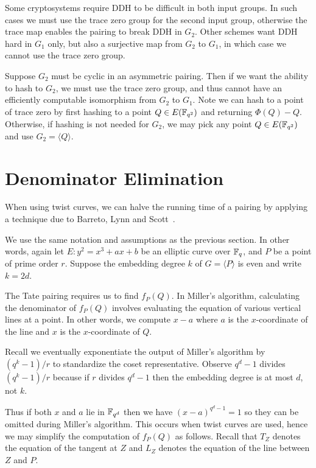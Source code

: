 Some cryptosystems require DDH to be difficult in both input groups. In
such cases we must use the trace zero group for the second input group,
otherwise the trace map enables the pairing to break DDH in $G_2$.
Other schemes want DDH hard in $G_1$ only, but also a surjective map
from $G_2$ to $G_1$, in which case we cannot use the trace zero group.

Suppose $G_2$ must be cyclic in an asymmetric pairing.
Then if we want the ability to hash to $G_2$,
we must use the trace zero group, and thus cannot have an efficiently
computable isomorphism from $G_2$ to $G_1$.
Note we can hash to a point of trace zero
by first hashing to a point $Q \in E(\mathbb{F}_{q^2})$ and returning $\Phi(Q) - Q$.
Otherwise, if hashing is not needed for $G_2$, we may pick any point
$Q \in E(\mathbb{F}_{q^2})$ and use $G_2 = \langle Q \rangle$.

\section {\label{sec:denomelim}Denominator Elimination}

When using twist curves, we can halve the running time of a pairing by applying
a technique due to Barreto, Lynn and Scott~\cite{bals2}.

We use the same notation and assumptions as the previous section.
In other words, again let $E : y^2 = x^3 + a x + b$ be an elliptic curve
over $\mathbb{F}_q$,
and $P$ be a point of prime order $r$.
Suppose the embedding degree $k$ of $G = \langle P \rangle$ is even
and write $k = 2d$.

The Tate pairing requires us to find $f_P(Q)$.
In Miller's algorithm, calculating the denominator of
$f_P(Q)$ involves evaluating the equation of various vertical lines
at a point. In other words, we compute $x - a$ where $a$ is the
$x$-coordinate of the line and $x$ is the $x$-coordinate of $Q$.

Recall we eventually exponentiate the output of Miller's algorithm by
$(q^k - 1)/r$ to standardize the coset representative. Observe
$q^d - 1$ divides $(q^k-1)/r$ because if $r$ divides $q^d - 1$ then
the embedding degree is at most $d$, not $k$.

Thus if both $x$ and $a$ lie in $\mathbb{F}_{q^d}$ then we have
$(x-a)^{q^d - 1} = 1$ so they can be omitted during Miller's algorithm.
This occurs when twist curves are used, hence we may simplify
the computation of $f_P(Q)$ as follows. Recall that $T_Z$ denotes the
equation of the tangent at $Z$ and $L_Z$ denotes the equation of
the line between $Z$ and $P$.

